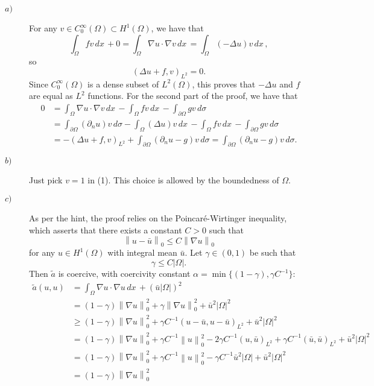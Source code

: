 \documentclass[a4paper]{article}
\newcommand{\abs}[1]{\left\lvert#1\right\rvert}
\newcommand{\dx}{\, dx \,}
\newcommand{\dsigma}{\, d\sigma}
\newcommand{\norm}[1]{\left\lVert#1\right\rVert}
\begin{document}
\begin{description}
\item[$a)$] For any $v \in C_0^\infty(\Omega) \subset H^1(\Omega)$, we have that
	\[
	\int_\Omega fv \dx + 0
	= \int_\Omega \nabla u \cdot \nabla v \dx
	= \int_\Omega (-\Delta u) v \dx,
	\]
	so
	\[
	(\Delta u + f, v)_{L^2} = 0.
	\]
	Since $C_0^\infty(\Omega)$ is a dense subset of $L^2(\Omega)$, this proves
	that $-\Delta u$ and $f$ are equal as $L^2$ functions.
	For the second part of the proof, we have that
	\begin{align*}
	0
&	= \int_\Omega \nabla u \cdot \nabla v \dx
	  - \int_\Omega fv \dx
	  - \int_{\partial \Omega} gv \dsigma \\
&	= \int_{\partial \Omega} (\partial_n u)v \dsigma
	  - \int_\Omega (\Delta u) v \dx
	  - \int_\Omega fv \dx
	  - \int_{\partial \Omega} gv \dsigma \\
&	= -(\Delta u + f, v)_{L^2} + \int_{\partial \Omega} (\partial_n u - g)v \dsigma
	= \int_{\partial \Omega} (\partial_n u - g)v \dsigma.
	\end{align*}
\item[$b)$] Just pick $v = 1$ in (1). This choice is allowed by the boundedness of $\Omega$.
\item[$c)$] As per the hint, the proof relies on the Poincaré-Wirtinger inequality,
	which asserts that there exists a constant $C > 0$ such that
	\[
	\norm{u-\bar{u}}_0 \leq C \norm{\nabla u}_0
	\]
	for any $u \in H^1(\Omega)$ with integral mean $\bar{u}$.
	Let $\gamma \in (0,1)$ be such that
	\[
	\gamma \leq C \abs{\Omega}.
	\]
	Then $\tilde{a}$ is coercive, with coercivity constant
	$\alpha = \min\{(1-\gamma),\gamma C^{-1}\}$:
	\begin{align*}
	\tilde{a}(u,u)
&	= \int_\Omega \nabla u \cdot \nabla u \dx + (\bar{u} \abs{\Omega})^2 \\
&	= (1-\gamma) \norm{\nabla u}_0^2 + \gamma \norm{\nabla u}_0^2
		+ \bar{u}^2 \abs{\Omega}^2 \\
&	\geq (1-\gamma) \norm{\nabla u}_0^2 + \gamma C^{-1} (u-\bar{u},u-\bar{u})_{L^2}
		+ \bar{u}^2 \abs{\Omega}^2 \\
&	= (1-\gamma) \norm{\nabla u}_0^2
		+ \gamma C^{-1} \norm{u}_0^2
		- 2 \gamma C^{-1} (u,\bar{u})_{L^2}
		+ \gamma C^{-1} (\bar{u},\bar{u})_{L^2}
		+ \bar{u}^2 \abs{\Omega}^2 \\
&	= (1-\gamma) \norm{\nabla u}_0^2
		+ \gamma C^{-1} \norm{u}_0^2
		- \gamma C^{-1} \bar{u}^2 \abs{\Omega}
		+ \bar{u}^2 \abs{\Omega}^2 \\
&	= (1-\gamma) \norm{\nabla u}_0^2

\end{align*}
\end{description}
\end{document}
